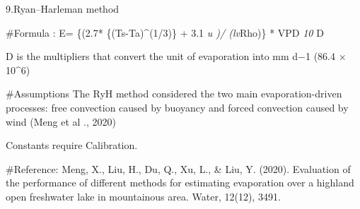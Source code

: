 \documentclass[
]{article}
\begin{document}
9.Ryan--Harleman method

\#Formula : E= \{(2.7* \{(Ts-Ta)\^{}(1/3)\} + 3.1 \emph{u )/ (lv}Rho)\}
* VPD \emph{10 }D

D is the multipliers that convert the unit of evaporation into mm d−1
(86.4 × 10\^{}6)

\#Assumptions The RyH method considered the two main evaporation-driven
processes: free convection caused by buoyancy and forced convection
caused by wind (Meng et al ., 2020)

Constants require Calibration.

\#Reference: Meng, X., Liu, H., Du, Q., Xu, L., \& Liu, Y. (2020).
Evaluation of the performance of different methods for estimating
evaporation over a highland open freshwater lake in mountainous area.
Water, 12(12), 3491.
\end{document}
